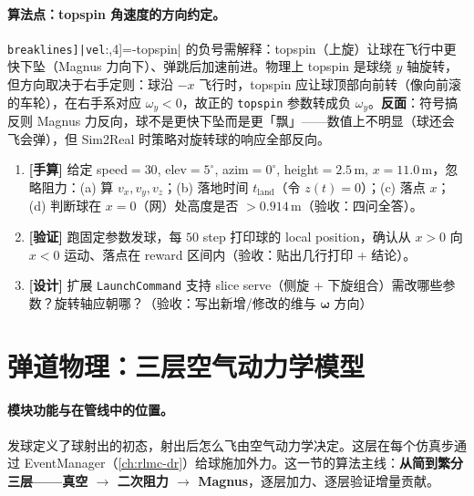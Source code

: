 
\paragraph{算法点：topspin 角速度的方向约定。}\Verb[breaklines]|vel[:,4]=-topspin| 的负号需解释：topspin（上旋）让球在飞行中更快下坠（Magnus 力向下）、弹跳后加速前进。物理上 topspin 是球绕 $y$ 轴旋转，但方向取决于右手定则：球沿 $-x$ 飞行时，topspin 应让球顶部向前转（像向前滚的车轮），在右手系对应 $\omega_y<0$，故正的 \verb|topspin| 参数转成负 $\omega_y$。\textbf{反面}：符号搞反则 Magnus 力反向，球不是更快下坠而是更「飘」——数值上不明显（球还会飞会弹），但 Sim2Real 时策略对旋转球的响应全部反向。

\begin{practice}[本节动手任务]
\begin{enumerate}
  \item \textbf{[手算]} 给定 speed$=30$, elev$=5^\circ$, azim$=0^\circ$, height$=2.5$\,m, $x=11.0$\,m，忽略阻力：(a) 算 $v_x,v_y,v_z$；(b) 落地时间 $t_{\text{land}}$（令 $z(t)=0$）；(c) 落点 $x$；(d) 判断球在 $x=0$（网）处高度是否 $>0.914$\,m（验收：四问全答）。
  \item \textbf{[验证]} 跑固定参数发球，每 $50$ step 打印球的 local position，确认从 $x>0$ 向 $x<0$ 运动、落点在 reward 区间内（验收：贴出几行打印 + 结论）。
  \item \textbf{[设计]} 扩展 \verb|LaunchCommand| 支持 slice serve（侧旋 + 下旋组合）需改哪些参数？旋转轴应朝哪？（验收：写出新增/修改的维与 $\boldsymbol\omega$ 方向）
\end{enumerate}
\end{practice}

\section{弹道物理：三层空气动力学模型}
\label{sec:rlmc-tennis-aero}

\paragraph{模块功能与在管线中的位置。}发球定义了球射出的初态，射出后怎么飞由空气动力学决定。这层在每个仿真步通过 EventManager（\cref{ch:rlmc-dr}）给球施加外力。这一节的算法主线：\textbf{从简到繁分三层——真空 $\to$ 二次阻力 $\to$ Magnus}，逐层加力、逐层验证增量贡献。


